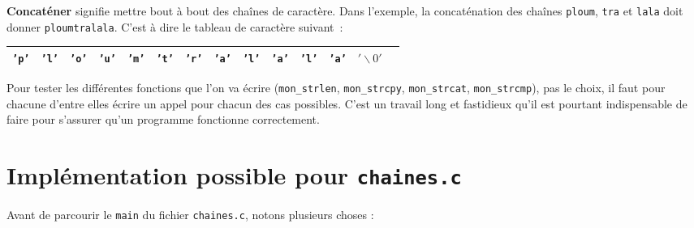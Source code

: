 \documentclass[10pt]{article}
\begin{document}
\begin{enumerate}[label=\textbf{[\alph*]}]
  \setlength\itemsep{1em}

\item \textbf{Concaténer} signifie mettre bout à bout des chaînes de
  caractère. Dans l'exemple, la concaténation des chaînes \texttt{ploum},
  \texttt{tra} et \texttt{lala} doit donner
  \texttt{ploumtralala}. C'est à dire le tableau de caractère
  suivant~:

  \begin{center}
    \begin{tabular}{|c|c|c|c|c|c|c|c|c|c|c|c|c|c}
      \hline
      \texttt{'p'} & \texttt{'l'} & \texttt{'o'} & \texttt{'u'} & \texttt{'m'} & \texttt{'t'} & \texttt{'r'} & \texttt{'a'} & \texttt{'l'} & \texttt{'a'} & \texttt{'l'} & \texttt{'a'} & \texttt{$'\backslash 0'$}  & \\
      \hline
    \end{tabular}
  \end{center}

\item Pour tester les différentes fonctions que l'on va écrire
  (\texttt{mon\_strlen}, \texttt{mon\_strcpy}, \texttt{mon\_strcat},
  \texttt{mon\_strcmp}), pas le choix, il faut pour chacune d'entre
  elles écrire un appel pour chacun des cas possibles. C'est un travail
  long et fastidieux qu'il est pourtant indispensable de faire pour
  s'assurer qu'un programme fonctionne correctement.

\end{enumerate}

\newpage

\section{Implémentation possible pour \texttt{chaines.c}}



\vspace{0.5cm}

Avant de parcourir le \texttt{main} du fichier \texttt{chaines.c},
notons plusieurs choses :
\end{document}
